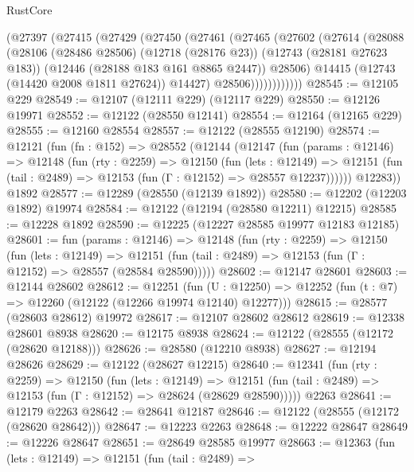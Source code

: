 \begin{lexlean}{RustCore}
\begin{coremodule}
            (@27397
              (@27415
                (@27429
                  (@27450
                    (@27461
                      (@27465
                        (@27602
                          (@27614
                            (@28088
                              (@28106
                                (@28486 @28506)
                                (@12718 (@28176 @23))
                                (@12743 (@28181 @27623 @183))
                                (@12446 (@28188 @183 @161 @8865 @2447))
                                @28506)
                              @14415
                              (@12743 (@14420 @2008 @1811 @27624))
                              @14427)
                            @28506))))))))))))
@28545 := @12105 @229
@28549 := @12107 (@12111 @229) (@12117 @229)
@28550 := @12126 @19971
@28552 := @12122 (@28550 @12141)
@28554 := @12164 (@12165 @229)
@28555 := @12160 @28554
@28557 := @12122 (@28555 @12190)
@28574 := @12121
    (fun (fn : @152) =>
    @28552
      (@12144
        (@12147
          (fun (params : @12146) =>
          @12148
            (fun (rty : @2259) =>
            @12150
              (fun (lets : @12149) =>
              @12151 (fun (tail : @2489) => @12153 (fun (Γ : @12152) => @28557 @12237))))))
        @12283))
    @1892
@28577 := @12289 (@28550 (@12139 @1892))
@28580 := @12202 (@12203 @1892) @19974
@28584 := @12122 (@12194 (@28580 @12211) @12215)
@28585 := @12228 @1892
@28590 := @12225 (@12227 @28585 @19977 @12183 @12185)
@28601 := fun (params : @12146) =>
  @12148
    (fun (rty : @2259) =>
    @12150
      (fun (lets : @12149) =>
      @12151 (fun (tail : @2489) => @12153 (fun (Γ : @12152) => @28557 (@28584 @28590)))))
@28602 := @12147 @28601
@28603 := @12144 @28602
@28612 := @12251
    (fun (U : @12250) => @12252 (fun (t : @7) => @12260 (@12122 (@12266 @19974 @12140) @12277)))
@28615 := @28577 (@28603 @28612) @19972
@28617 := @12107 @28602 @28612
@28619 := @12338 @28601 @8938
@28620 := @12175 @8938
@28624 := @12122 (@28555 (@12172 (@28620 @12188)))
@28626 := @28580 (@12210 @8938)
@28627 := @12194 @28626
@28629 := @12122 (@28627 @12215)
@28640 := @12341
    (fun (rty : @2259) =>
    @12150
      (fun (lets : @12149) =>
      @12151 (fun (tail : @2489) => @12153 (fun (Γ : @12152) => @28624 (@28629 @28590)))))
    @2263
@28641 := @12179 @2263
@28642 := @28641 @12187
@28646 := @12122 (@28555 (@12172 (@28620 @28642)))
@28647 := @12223 @2263
@28648 := @12222 @28647
@28649 := @12226 @28647
@28651 := @28649 @28585 @19977
@28663 := @12363
    (fun (lets : @12149) =>
    @12151
      (fun (tail : @2489) =>

\end{coremodule}
\end{lexlean}
